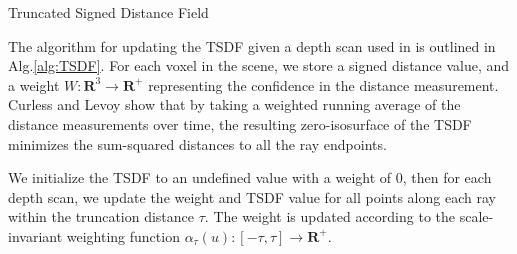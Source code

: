 \documentclass[conference]{IEEEtran}
\newcommand{\algoref}[1]{Alg.\ref{#1}}
\newcommand{\TSDF}{TSDF\xspace}
\begin{document}
\begin{algorithm}[t!]
	\caption{Truncated Signed Distance Field}
	\label{alg:TSDF}
	\begin{algorithmic}[1]
		 
			 
				 
				\label{alg:line:dynamic_tsdf}
			     
				    	\label{alg:line:voxel_carve}
					\EndIf
			    \EndFor
				 		 
					\label{alg:line:tsdf_update}
				\EndFor
			\EndFor
		\EndFor
	\end{algorithmic}
\end{algorithm}

The algorithm for updating the \TSDF given a depth scan used in
\cite{Curless1996} is outlined in
\algoref{alg:TSDF}. For each voxel in the scene, we store a signed distance
value, and a weight $W : \mathbf{R}^3 \to \mathbf{R^{+}}$ representing the confidence
in the distance measurement. Curless and Levoy show that by taking a weighted
running average of the distance measurements over time,  the resulting
zero-isosurface of the \TSDF minimizes the sum-squared distances to all the ray
endpoints.

We initialize the \TSDF to an undefined value with a
weight of $0$, then for each depth scan, we update the weight and \TSDF value
for all points along each ray within the truncation distance $\tau$. The weight
is updated according to the scale-invariant weighting function $\alpha_{\tau}(u)
:[-\tau,\tau]\to \mathbf{R^{+}} $.

% 
%  
\end{document}
